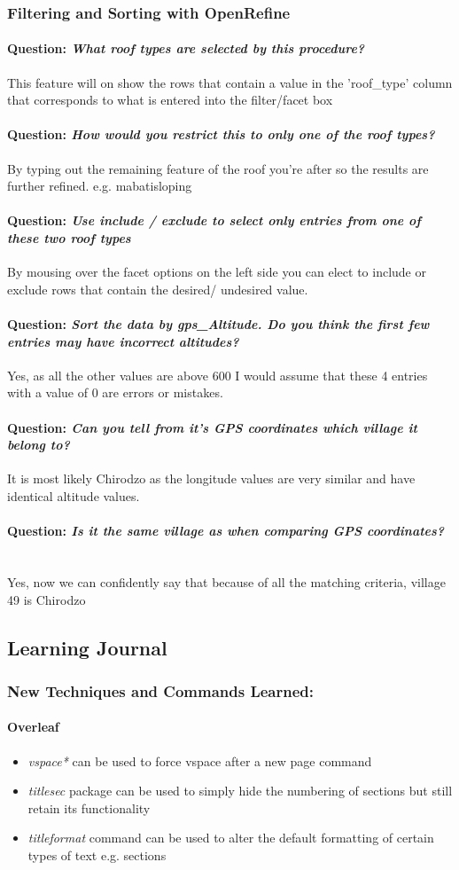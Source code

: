 \documentclass[12pt]{article}
\newcommand{\learning}[2]{\item \textit{#1} \textnormal{#2}}
\newcommand{\question}[1]{\paragraph{Question: {\textnormal{\textit{#1}}} ~\\}}
\begin{document}
\subsubsection{Filtering and Sorting with OpenRefine}
\question{What roof types are selected by this procedure?}
This feature will on show the rows that contain a value in the 'roof\_type' column that corresponds to what is entered into the filter/facet box
\question{How would you restrict this to only one of the roof types?}
By typing out the remaining feature of the roof you're after so the results are further refined. e.g. mabatisloping
\question{Use include / exclude to select only entries from one of these two roof types}
By mousing over the facet options on the left side you can elect to include or exclude rows that contain the desired/ undesired value.
\question{Sort the data by gps\_Altitude. Do you think the first few entries may have incorrect altitudes?}
Yes, as all the other values are above 600 I would assume that these 4 entries with a value of 0 are errors or mistakes.
\question{Can you tell from it’s GPS coordinates which village it belong to?}
It is most likely Chirodzo as the longitude values are very similar and have identical altitude values. 
\question{Is it the same village as when comparing GPS coordinates?}
Yes, now we can confidently say that because of all the matching criteria, village 49 is Chirodzo
\subsection{Learning Journal}
\subsubsection{New Techniques and Commands Learned:}
\paragraph{Overleaf}
\begin{itemize}
    \learning{vspace*}{can be used to force vspace after a new page command}
    \learning{titlesec}{package can be used to simply hide the numbering of sections but still retain its functionality}
    \learning{titleformat}{command can be used to alter the default formatting of certain types of text e.g. sections}
\end{itemize}
\end{document}
